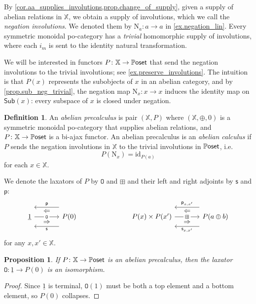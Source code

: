 \documentclass[11pt, oneside, article]{memoir}
\theoremstyle{plain}
\newtheorem{proposition}[theorem]{Proposition}
\theoremstyle{definition}
\newtheorem{definition}[theorem]{Definition}
\theoremstyle{remark}
\newcommand{\ord}[1]{\underline{#1}}%
\newcommand{\const}[1]{\mathtt{#1}}%
\newcommand{\Cat}[1]{{\mathsf{#1}}}%
\newcommand{\CCat}[1]{\mathbb{\StrLeft{#1}{1}}\Cat{\StrGobbleLeft{#1}{1}}}%
\newcommand{\funn}[1]{\mathrm{#1}}%
\newcommand{\Funr}[1]{\mathsf{#1}}%
\newcommand{\xx}{\mathbb{X}}
\newcommand{\sub}{\Funr{Sub}}
\newcommand{\sss}{\Funr{s}}
\newcommand{\ppp}{\Funr{p}}
\newcommand{\id}{\funn{id}}
\newcommand{\Neg}[1]{\funn{N}_{#1}}
\newcommand{\abc}{P} %
\newcommand{\pposet}{\CCat{Poset}}
\newcommand{\zero}{\const{O}}
\newcommand{\adjphantom}[3][-.6pt]{\ar[#2, phantom, "#3" yshift=#1]}
\begin{document}
By \cref{cor.aa_supplies_involutions,prop.change_of_supply}, given a supply of abelian relations in $\xx$, we obtain a supply of involutions, which we call the \emph{negation involutions}. We denoted them by $\Neg{a}\colon a\to a$ in \cref{ex.negation_lin}. Every symmetric monoidal po-category has a \emph{trivial} homomorphic supply of involutions, where each $i_m$ is sent to the identity natural transformation. 

We will be interested in functors $\abc\colon\xx\to\pposet$ that send the negation involutions to the trivial involutions; see \cref{ex.preserve_involutions}. The intuition is that $\abc(x)$ represents the subobjects of $x$ in an abelian category, and by \cref{prop.sub_neg_trivial}, the negation map $\Neg{x}\colon x\to x$ induces the identity map on $\sub(x)$: every subspace of $x$ is closed under negation.

\begin{definition}\label{def.ab_precalc_calc}
An \emph{abelian precalculus} is pair $(\xx,\abc)$ where $(\xx,\oplus,0)$ is a symmetric monoidal po-category that supplies abelian relations, and $\abc\colon\xx\to\pposet$ is a bi-ajax functor. An abelian precalculus is an \emph{abelian calculus} if $\abc$ sends the negation involutions in $\xx$ to the trivial involutions in $\pposet$, i.e.\
\[\abc(\Neg{x})=\id_{\abc(a)}\]
for each $x\in\xx$.
\end{definition}
We denote the laxators of $\abc$ by $\zero$ and $\boxplus$ and their left and right adjoints by $\sss$ and $\ppp$:
\[
\begin{tikzcd}[column sep=large]
	\ord{1}\ar[r, "\zero" description]\adjphantom[-8pt]{r}{\Rightarrow}\adjphantom[8pt]{r}{\Leftarrow}&
	\abc(0)\ar[l, shift left=14pt, "\sss"]\ar[l, shift right=14pt, "\ppp"']
\end{tikzcd}
\hspace{1in}
\begin{tikzcd}[column sep=large]
	\abc(x)\times \abc(x')\ar[r, "\boxplus" description]\adjphantom[-8pt]{r}{\Rightarrow}\adjphantom[8pt]{r}{\Leftarrow}&
	\abc(a\oplus b)\ar[l, shift left=14pt, "\sss_{x,x'}"]\ar[l, shift right=14pt, "\ppp_{x,x'}"']
\end{tikzcd}
\]
for any $x,x'\in\xx$.

\begin{proposition} \label{prop.zero_iso}
If $\abc\colon\xx\to\pposet$ is an abelian precalculus, then the laxator $\zero\colon\ord{1}\to \abc(0)$ is an isomorphism.
\end{proposition}
\begin{proof}
Since $\ord{1}$ is terminal, $\zero(1)$ must be both a top element and a bottom element, so $\abc(0)$ collapses.
\end{proof}
\end{document}
